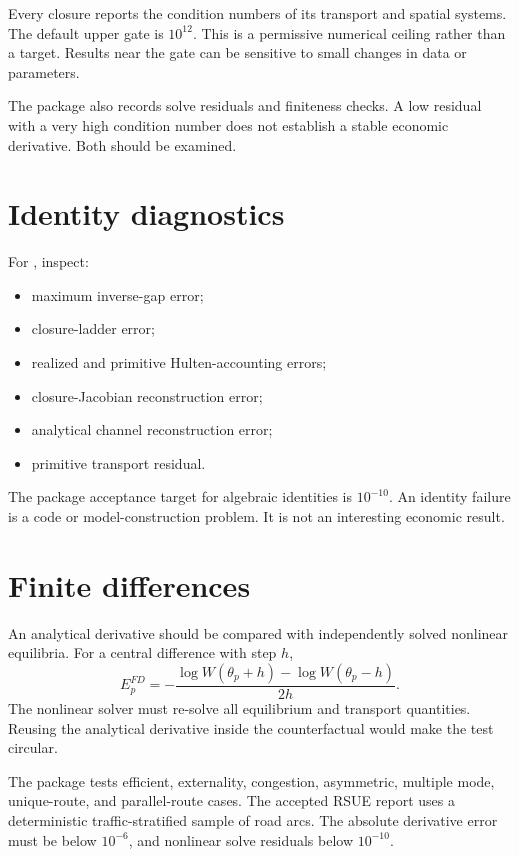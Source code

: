 Every closure reports the condition numbers of its transport and spatial
systems. The default upper gate is \(10^{12}\). This is a permissive numerical
ceiling rather than a target. Results near the gate can be sensitive to small
changes in data or parameters.

The package also records solve residuals and finiteness checks. A low residual
with a very high condition number does not establish a stable economic
derivative. Both should be examined.

\section{Identity diagnostics}

For , inspect:
\begin{itemize}
  \item maximum inverse-gap error;
  \item closure-ladder error;
  \item realized and primitive Hulten-accounting errors;
  \item closure-Jacobian reconstruction error;
  \item analytical channel reconstruction error;
  \item primitive transport residual.
\end{itemize}
The package acceptance target for algebraic identities is \(10^{-10}\). An
identity failure is a code or model-construction problem. It is not an
interesting economic result.

\section{Finite differences}

An analytical derivative should be compared with independently solved
nonlinear equilibria. For a central difference with step \(h\),
\[
 E_p^{FD}
 =-\frac{\log W(\theta_p+h)-\log W(\theta_p-h)}{2h}.
\]
The nonlinear solver must re-solve all equilibrium and transport quantities.
Reusing the analytical derivative inside the counterfactual would make the
test circular.

The package tests efficient, externality, congestion, asymmetric, multiple
mode, unique-route, and parallel-route cases. The accepted RSUE report uses a
deterministic traffic-stratified sample of road arcs. The absolute derivative
error must be below \(10^{-6}\), and nonlinear solve residuals below
\(10^{-10}\).

